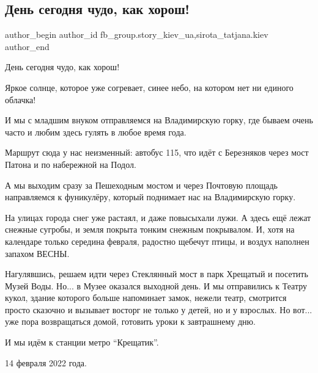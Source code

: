  
 
 
 
 
 
\subsection{День сегодня чудо, как хорош!}
\label{sec:15_02_2022.fb.fb_group.story_kiev_ua.1.den_segodnja_chudo}
 
\ifcmt
 author_begin
   author_id fb_group.story_kiev_ua,sirota_tatjana.kiev
 author_end
\fi

День сегодня чудо, как хорош!

Яркое солнце, которое уже согревает, синее небо, на котором нет ни единого
облачка!

И мы с младшим внуком отправляемся на Владимирскую горку, где бываем очень часто
и любим здесь гулять в любое время года.

Маршрут сюда у нас неизменный: автобус 115, что идёт с Березняков через мост
Патона и по набережной на Подол.

\raggedcolumns
\begin{multicols}{3} %
\setlength{\parindent}{0pt}




\end{multicols} %

А мы выходим сразу за Пешеходным мостом и через Почтовую площадь направляемся к
фуникулёру, который поднимает нас на Владимирскую горку.

На улицах города снег уже растаял, и даже повысыхали лужи. А здесь ещё лежат
снежные сугробы, и земля покрыта тонким снежным покрывалом. И, хотя на календаре
только середина февраля, радостно щебечут птицы, и воздух наполнен  запахом
ВЕСНЫ.

Нагулявшись, решаем идти через Стеклянный мост в парк Хрещатый и посетить Музей
Воды. Но... в Музее оказался выходной день. И мы отправились к Театру
кукол, здание которого больше напоминает замок, нежели театр, смотрится просто
сказочно и вызывает восторг не только у детей, но и у взрослых. Но вот... уже
пора возвращаться домой, готовить уроки к завтрашнему дню.

И мы идём к станции метро \enquote{Крещатик}.

14 февраля 2022 года.
